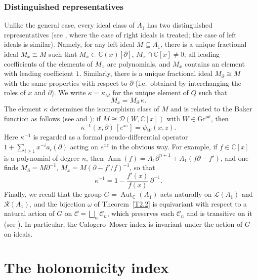 \documentclass[11pt,reqno]{amsart}
\theoremstyle{plain}
\theoremstyle{definition}
\theoremstyle{remark}
\numberwithin{equation}{section}
\newcommand{\cD}{\mathcal{D}}
\newcommand{\cC}{\mathcal{C}}
\newcommand{\cL}{\mathcal{L}}
\newcommand{\cR}{\mathcal{R}}
\newcommand{\C}{\mathbb{C}}
\newcommand{\del}{\partial}
\newcommand{\Gra}{\mathrm{Gr}^{\mathrm{ad}}}
\DeclareMathOperator{\Ann}{Ann}
\DeclareMathOperator{\Aut}{Aut}
\begin{document}
\subsubsection*{Distinguished representatives}
Unlike the general case, every ideal class of $A_1$ has two distinguished representatives (see
\cite[Section~5.1]{BerestWilsonNC}, where the case of right ideals is treated; the case of left
ideals is similar). Namely, for any left ideal $M \subseteq A_1$, there is a
unique fractional ideal $M_x \cong M$ such that $M_x \subset \C(x)[\del]$, $M_x \cap \C[x] \ne 0$,
all leading coefficients of the elements of $M_x$ are polynomials, and $M_x$ contains an element
with leading coefficient $1$. Similarly, there is a unique fractional ideal $M_\del \cong M$ with
the same properties with respect to $\del$ (i.e.\ obtained by interchanging the roles of $x$ and
$\del$). We write $\kappa = \kappa_M$ for the unique element of $Q$ such that
\begin{equation}
\label{E214}
  M_x = M_\del\, \kappa .
\end{equation}
The element $\kappa$ determines the isomorphism class of $M$ and is related to the Baker function
as follows (see \cite[Proposition~9.2]{BerestWilson00} and
\cite[Remark~5.4]{BerestWilsonNC}): if $M \cong \cD(W, \C[x])$ with
$W \in \Gra$, then
\begin{equation}
\label{E215}
  \kappa^{-1}(x, \del)\,[e^{xz}] = \psi_W(x,z) .
\end{equation}
Here $\kappa^{-1}$ is regarded as a formal pseudo-differential operator
$1 + \sum_{i \ge 1} x^{-i} a_i(\del)$ acting on $e^{xz}$ in the obvious way. For example, if
$f \in \C[x]$ is a polynomial of degree $n$, then $\Ann(f) = A_1 \del^{n+1} + A_1 (f \del - f')$,
and one finds $M_\del = M \del^{-1}$, $M_x = M (\del - f'/f)^{-1}$, so that
\begin{equation}
\label{E216}
  \kappa^{-1} = 1 - \frac{f'(x)}{f(x)}\, \del^{-1} .
\end{equation}
Finally, we recall that the group $G = \Aut_{\C}(A_1)$ acts naturally on $\cL(A_1)$ and
$\cR(A_1)$, and the bijection $\omega$ of Theorem~\ref{T2.2} is equivariant with respect to a
natural action of $G$ on $\cC = \bigsqcup_n \cC_n$, which preserves each $\cC_n$ and is transitive
on it (see \cite[Theorems~1.2 and 1.3]{BerestWilson00}). In particular, the Calogero--Moser index
is invariant under the action of $G$ on ideals.


\section{The holonomicity index}
\label{S3}
\end{document}
